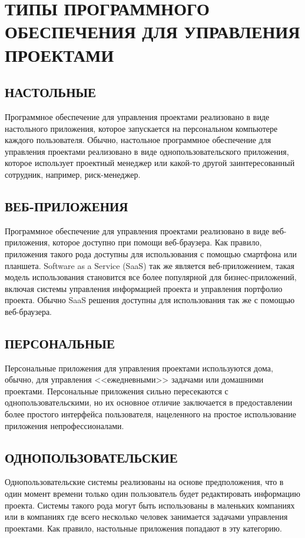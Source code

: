 \documentclass[14pt, a4paper]{extreport}
\begin{document}
\section{\MakeTextUppercase{Типы программного обеспечения для управления проектами}}
\subsection{\MakeTextUppercase{Настольные}}
Программное обеспечение для управления проектами реализовано в виде настольного приложения,
которое запускается на персональном компьютере каждого пользователя. Обычно, настольное
программное обеспечение для управления проектами реализовано в виде однопользовательского
приложения, которое использует проектный менеджер или какой-то другой заинтересованный
сотрудник, например, риск-менеджер.

\subsection{\MakeTextUppercase{Веб-приложения}}
Программное обеспечение для управления проектами реализовано в виде веб-приложения,
которое доступно при помощи веб-браузера. Как правило, приложения такого рода доступны
для использования с помощью смартфона или планшета. Software as a Service (SaaS) так же
является веб-приложением, такая модель использования становится все более популярной
для бизнес-приложений, включая системы управления информацией проекта и управления
портфолио проекта. Обычно SaaS решения доступны для использования так же с помощью
веб-браузера.

\subsection{\MakeTextUppercase{Персональные}}
Персональные приложения для управления проектами используются дома, обычно, для
управления <<ежедневными>> задачами или домашними проектами. Персональные приложения
сильно пересекаются с однопользовательскими, но их основное отличие заключается в
предоставлении более простого интерфейса пользователя, нацеленного на простое
использование приложения непрофессионалами.
\subsection{\MakeTextUppercase{Однопользовательские}}
Однопользовательские системы реализованы на основе предположения, что в один момент
времени только один пользователь будет редактировать информацию проекта. Системы такого
рода могут быть использованы в маленьких компаниях или в компаниях где всего несколько
человек занимается задачами управления проектами. Как правило, настольные приложения
попадают в эту категорию.
\end{document}
